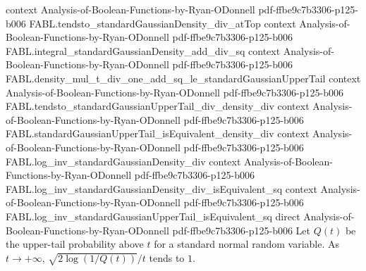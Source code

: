 \begin{theorem}
  {context}
  {Analysis-of-Boolean-Functions-by-Ryan-ODonnell}
  {pdf-ffbe9c7b3306-p125-b006}
\proofstep
  {FABL.tendsto_standardGaussianDensity_div_atTop}
  {context}
  {Analysis-of-Boolean-Functions-by-Ryan-ODonnell}
  {pdf-ffbe9c7b3306-p125-b006}
\proofstep
  {FABL.integral_standardGaussianDensity_add_div_sq}
  {context}
  {Analysis-of-Boolean-Functions-by-Ryan-ODonnell}
  {pdf-ffbe9c7b3306-p125-b006}
\proofstep
  {FABL.density_mul_t_div_one_add_sq_le_standardGaussianUpperTail}
  {context}
  {Analysis-of-Boolean-Functions-by-Ryan-ODonnell}
  {pdf-ffbe9c7b3306-p125-b006}
\proofstep
  {FABL.tendsto_standardGaussianUpperTail_div_density_div}
  {context}
  {Analysis-of-Boolean-Functions-by-Ryan-ODonnell}
  {pdf-ffbe9c7b3306-p125-b006}
\proofstep
  {FABL.standardGaussianUpperTail_isEquivalent_density_div}
  {context}
  {Analysis-of-Boolean-Functions-by-Ryan-ODonnell}
  {pdf-ffbe9c7b3306-p125-b006}
\proofstep
  {FABL.log_inv_standardGaussianDensity_div}
  {context}
  {Analysis-of-Boolean-Functions-by-Ryan-ODonnell}
  {pdf-ffbe9c7b3306-p125-b006}
\proofstep
  {FABL.log_inv_standardGaussianDensity_div_isEquivalent_sq}
  {context}
  {Analysis-of-Boolean-Functions-by-Ryan-ODonnell}
  {pdf-ffbe9c7b3306-p125-b006}
\proofstep
  {FABL.log_inv_standardGaussianUpperTail_isEquivalent_sq}
  {direct}
  {Analysis-of-Boolean-Functions-by-Ryan-ODonnell}
  {pdf-ffbe9c7b3306-p125-b006}
Let $Q(t)$ be the upper-tail probability above $t$ for a standard normal random
variable. As $t\to+\infty$, $\sqrt{2\log(1/Q(t))}/t$ tends to $1$.
\end{theorem}

